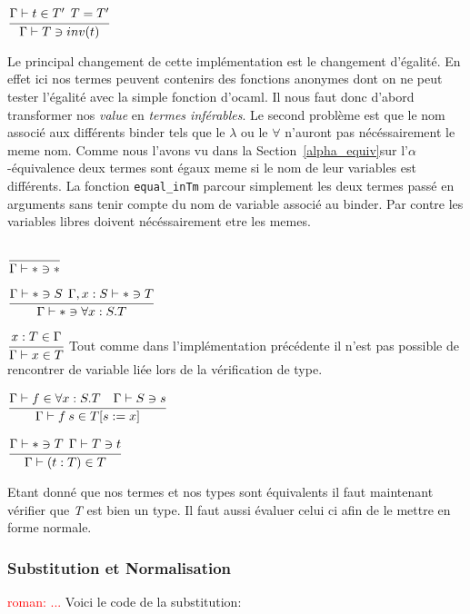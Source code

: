 \documentclass {article}
\newcommand{\codefrom}[3]
           {}
\theoremstyle{definition}
\theoremstyle{remark}
\newcommand{\todo}[1]{\textcolor{red}{#1}}
\newcommand{\fun}[1]{\lstinline!#1!}
\begin{document}
\codefrom{dependent}{lambda}{check_inv}
$\cfrac{\Gamma \vdash t \in T' \:\: T=T'}
    {\Gamma\vdash T \ni inv(t)}$

Le principal changement de cette implémentation est le changement d'égalité. 
En effet ici nos termes peuvent contenirs des fonctions anonymes dont on ne peut 
tester l'égalité avec la simple fonction d'ocaml. Il nous faut donc d'abord transformer 
nos \emph{value} en \emph{termes inférables}. Le second problème est que le nom associé 
aux différents binder tels que le $\lambda$ ou le $\forall$ n'auront pas nécéssairement le 
meme nom. Comme nous l'avons vu dans la Section~\ref{alpha_equiv}sur l'$\alpha$-équivalence 
deux termes sont égaux meme si le nom de leur variables est différents. 
La fonction \fun{equal_inTm} parcour simplement les deux termes passé en arguments sans tenir compte
du nom de variable associé au binder. Par contre les variables libres doivent nécéssairement etre les memes.

\codefrom{dependent}{lambda}{check_star}
$\cfrac{}
    {\Gamma \vdash * \ni *}$



\codefrom{dependent}{lambda}{check_pi}
$\cfrac{\Gamma \vdash * \ni S\:\:\Gamma,x:S \vdash *\ni T}
    {\Gamma\vdash * \ni \forall x:S.T}$





\codefrom{dependent}{lambda}{synth_var}
$\cfrac{x:T \in \Gamma}
    {\Gamma \vdash x \in T }$
Tout comme dans l'implémentation précédente il n'est pas possible de rencontrer de variable 
liée lors de la vérification de type.

\codefrom{dependent}{lambda}{synth_app}

$\cfrac{\Gamma \vdash f \in \forall x:S.T \quad \Gamma\vdash S \ni s }
    {\Gamma\vdash f\:s\in T[s := x]}$



\codefrom{dependent}{lambda}{synth_ann}

$\cfrac{\Gamma\vdash * \ni T \:\:\Gamma\vdash T \ni t}
    {\Gamma\vdash (t:T) \in T}$

Etant donné que nos termes et nos types sont équivalents il faut maintenant vérifier que 
\emph{T} est bien un type. Il faut aussi évaluer celui ci afin de le mettre en forme normale.



\subsubsection{Substitution et Normalisation}
\todo{roman: ...}
Voici le code de la substitution:
\codefrom{dependent}{lambda}{substitution_inTm}
\codefrom{dependent}{lambda}{substitution_exTm}
\end{document}
